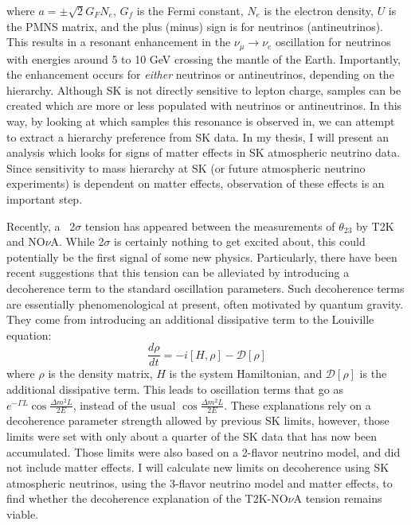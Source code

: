 \documentclass[12pt,oneside,openright]{article}
\begin{document}
where $a=\pm\sqrt{2}G_FN_e$, $G_f$ is the Fermi constant, $N_e$ is the electron density, $U$ is the PMNS matrix, and the plus (minus) sign is for neutrinos (antineutrinos).  This results in a resonant enhancement in the $\nu_\mu \rightarrow \nu_e$ oscillation for neutrinos with energies around 5 to 10 GeV crossing the mantle of the Earth.  Importantly, the enhancement occurs for \emph{either} neutrinos or antineutrinos, depending on the hierarchy.  Although SK is not directly sensitive to lepton charge, samples can be created which are more or less populated with neutrinos or antineutrinos.  In this way, by looking at which samples this resonance is observed in, we can attempt to extract a hierarchy preference from SK data.  In my thesis, I will present an analysis which looks for signs of matter effects in SK atmospheric neutrino data.  Since sensitivity to mass hierarchy at SK (or future atmospheric neutrino experiments) is dependent on matter effects, observation of these effects is an important step.\par
Recently, a ~2$\sigma$ tension has appeared between the measurements of $\theta_{23}$ by T2K and NO$\nu$A.  While 2$\sigma$ is certainly nothing to get excited about, this could potentially be the first signal of some new physics.  Particularly, there have been recent suggestions that this tension can be alleviated by introducing a decoherence term to the standard oscillation parameters.  Such decoherence terms are essentially phenomenological at present, often motivated by quantum gravity.  They come from introducing an additional dissipative term to the Louiville equation:
\begin{equation}
\frac{d\rho}{dt}=-i[H,\rho]-\mathcal{D}[\rho]
\end{equation}
where $\rho$ is the density matrix, $H$ is the system Hamiltonian, and $\mathcal{D}[\rho]$ is the additional dissipative term.  This leads to oscillation terms that go as $e^{-\Gamma L} \cos \frac{\Delta m^2 L}{2E}$, instead of the usual $\cos \frac{\Delta m^2 L}{2E}$.     
These explanations rely on a decoherence parameter strength allowed by previous SK limits, however, those limits were set with only about a quarter of the SK data that has now been accumulated.  Those limits were also based on a 2-flavor neutrino model, and did not include matter effects.  I will calculate new limits on decoherence using SK atmospheric neutrinos, using the 3-flavor neutrino model and matter effects, to find whether the decoherence explanation of the T2K-NO$\nu$A tension remains viable.\par
\end{document}
